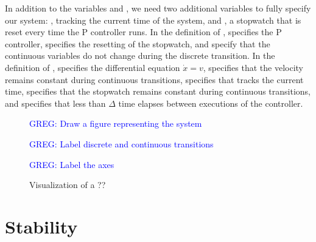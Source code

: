 \documentclass[preprint,nocopyrightspace]{sigplanconf}
\newcommand{\greg}[1]{\textcolor{blue}{\textsc{GREG}: #1}}
\begin{document}
In addition to the variables  and , we need two additional variables to fully specify our system: , tracking the current time of the system, and , a stopwatch that is reset every time the P controller runs.
In the definition of ,  specifies the P controller,  specifies the resetting of the stopwatch, and  specify that the continuous variables do not change during the discrete transition.
In the definition of ,  specifies the differential equation $\dot{x} = v$,  specifies that the velocity remains constant during continuous transitions,  specifies that  tracks the current time,  specifies that the stopwatch remains constant during continuous transitions, and  specifies that less than $\Delta$ time elapses between executions of the controller.

\begin{figure}

\greg{Draw a figure representing the system}

\greg{Label discrete and continuous transitions}

\greg{Label the axes}

\caption{Visualization of a ??}
\label{fig:system-visualization}
\end{figure}







\section{Stability}
\end{document}

